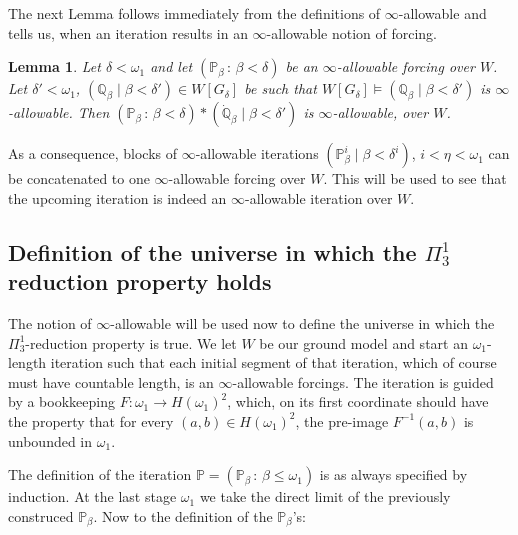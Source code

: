 \documentclass[a4paper,11pt]{article}
\newtheorem{lemma}[theorem]{Lemma}
\newcommand{\forceP}{\mathbb{P}}
\newcommand{\forceQ}{\mathbb{Q}}
\begin{document}
The next Lemma follows immediately from the definitions of $\infty$-allowable and tells us, when an iteration results in an $\infty$-allowable notion of forcing.
 \begin{lemma}\label{allowability}
Let $\delta < \omega_1$ and let  $(\forceP_{\beta} \, : \, \beta < \delta )$ be an $\infty$-allowable forcing over $W$.
Let $\delta' < \omega_1$,  $(\forceQ_{\beta} \mid \beta < \delta') \in W[G_{\delta}]$ be such that
$W[G_{\delta}]  \models  (\forceQ_{\beta} \mid \beta < \delta')$ is $\infty$-allowable.
Then $(\forceP_{\beta} \, : \, \beta < \delta ) \ast (\dot{\forceQ}_{\beta} \mid \beta < \delta')  $ is $\infty$-allowable, over $W$. 
\end{lemma}
As a consequence, blocks of $\infty$-allowable iterations $(\forceP^i_{\beta} \mid \beta < \delta^i)$, $i < \eta <\omega_1$ can be concatenated to one $\infty$-allowable forcing over $W$.
This will be used to see that the upcoming iteration is indeed an $\infty$-allowable iteration over $W$.
\subsection{Definition of the universe in which the ${\Pi^1_3}$ reduction property holds}
The notion of $\infty$-allowable will be used now to define the universe in which the ${\Pi^1_3}$-reduction property is true. We let $W$ be our ground model and start an $\omega_1$-length iteration such that each initial segment of that iteration, which of course must have countable length, is an $\infty$-allowable forcings.
The iteration is guided by a bookkeeping $F: \omega_1 \rightarrow H(\omega_1)^2$, which, on its first coordinate should have the property that for every $(a,b) \in H(\omega_1)^2$, the pre-image $F^{-1} (a,b)$ is unbounded in $\omega_1$.

The definition of the iteration $\forceP= (\forceP_{\beta} \, : \, \beta \le \omega_1)$ is as always specified by induction. At the last stage $\omega_1$ we take the direct limit of the previously construced $\forceP_{\beta}$. Now to the definition of the $\forceP_{\beta}$'s:
\end{document}
